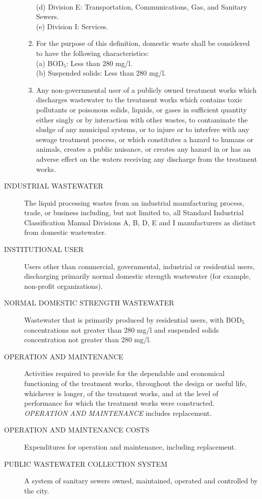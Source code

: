 \begin{description}
\begin{enumerate}
\\\indent(d) Division E:  Transportation, Communications, Gas, and Sanitary Sewers.
\\\indent(e) Division I:  Services.
\item For the purpose of this definition, domestic waste shall be considered to have the following characteristics:
\\\indent(a) BOD$_{5}$: Less than 280 mg/l.
\\\indent(b) Suspended solids:  Less than 280 mg/l.
\item Any non-governmental user of a publicly owned treatment works which discharges wastewater to the treatment works which contains toxic pollutants or poisonous solids, liquids, or gases in sufficient quantity either singly or by interaction with other wastes, to contaminate the sludge of any municipal systems, or to injure or to interfere with any sewage treatment process, or which constitutes a hazard to humans or animals, creates a public nuisance, or creates any hazard in or has an adverse effect on the waters receiving any discharge from the treatment works.
\end{enumerate}
\item[INDUSTRIAL WASTEWATER] The liquid processing wastes from an industrial manufacturing process, trade, or business including, but not limited to, all Standard Industrial Classification Manual Divisions A, B, D, E and I manufacturers as distinct from domestic wastewater.
\item[INSTITUTIONAL USER] Users other than commercial, governmental, industrial or residential users, discharging primarily normal domestic strength wastewater (for example, non-profit organizations).
\item[NORMAL DOMESTIC STRENGTH WASTEWATER] Wastewater that is primarily produced by residential users, with BOD$_{5}$ concentrations not greater than 280 mg/l and suspended solids concentration not greater than 280 mg/l.
\item[OPERATION AND MAINTENANCE] Activities required to provide for the dependable and economical functioning of the treatment works, throughout the design or useful life, whichever is longer, of the treatment works, and at the level of performance for which the treatment works were constructed.  \emph{OPERATION AND MAINTENANCE} includes replacement.
\item[OPERATION AND MAINTENANCE COSTS] Expenditures for operation and maintenance, including replacement.
\item[PUBLIC WASTEWATER COLLECTION SYSTEM] A system of sanitary sewers owned, maintained, operated and controlled by the city.

\end{description}
